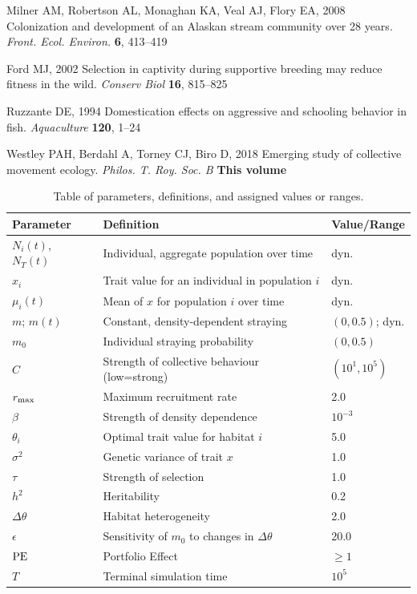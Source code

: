 \documentclass{revtex4}
\begin{document}
\begin{thebibliography}{10}
Milner AM, Robertson AL, Monaghan KA, Veal AJ, Flory EA, 2008 {Colonization and
  development of an Alaskan stream community over 28 years}.
\newblock \emph{Front. Ecol. Environ.} \textbf{6}, 413--419

Ford MJ, 2002 {Selection in captivity during supportive breeding may reduce
  fitness in the wild}.
\newblock \emph{Conserv Biol} \textbf{16}, 815--825

Ruzzante DE, 1994 {Domestication effects on aggressive and schooling behavior
  in fish}.
\newblock \emph{Aquaculture} \textbf{120}, 1--24

Westley PAH, Berdahl A, Torney CJ, Biro D, 2018 {Emerging study of collective
  movement ecology}.
\newblock \emph{Philos. T. Roy. Soc. B} \textbf{This volume}

\end{thebibliography}



\clearpage

\begin{table}[!t]
\begin{center}
\begin{tabular}{ l l l }
\hline
Parameter & Definition & Value/Range \\
\hline
$N_i(t)$, $N_T(t)$ & Individual, aggregate population over time & dyn.\\
$x_i$ & Trait value for an individual in population $i$ & dyn.\\
$\mu_i(t)$ & Mean of $x$ for population $i$ over time & dyn.\\
$m$; $m(t)$ & Constant, density-dependent straying & $(0,0.5)$; dyn.\\
$m_0$ & Individual straying probability & $(0,0.5)$\\
$C$ & Strength of collective behaviour (low=strong) & $(10^1,10^5)$\\
$r_{\rm max}$ & Maximum recruitment rate & 2.0 \\
$\beta$ & Strength of density dependence & $10^{-3}$\\
$\theta_i$ & Optimal trait value for habitat $i$ & 5.0\\
$\sigma^2$ & Genetic variance of trait $x$ & 1.0\\
$\tau$ & Strength of selection & 1.0\\
$h^2$ & Heritability & 0.2\\
$\Delta\theta$ & Habitat heterogeneity & 2.0\\
$\epsilon$ & Sensitivity of $m_0$ to changes in $\Delta\theta$ & 20.0\\
${\rm PE}$ & Portfolio Effect & $\geq1$\\
$T$ & Terminal simulation time & $10^5$\\
\hline
\end{tabular}
\end{center}
\caption{Table of parameters, definitions, and assigned values or ranges.}
\end{table}
\end{document}

